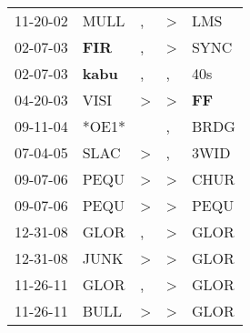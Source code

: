 \begin{supertabular}{p{0.07\textwidth}p{0.06\textwidth}p{0.02\textwidth}p{0.02\textwidth}p{0.06\textwidth}}
 11-20-02\textsuperscript{} &           MULL\textsuperscript{} &             , &  \textgreater &          LMS\textsuperscript{} \\
 02-07-03\textsuperscript{} &   \textbf{FIR\textsuperscript{}} &             , &  \textgreater &         SYNC\textsuperscript{} \\
 02-07-03\textsuperscript{} &  \textbf{kabu\textsuperscript{}} &             , &             , &          40s\textsuperscript{} \\
 04-20-03\textsuperscript{} &           VISI\textsuperscript{} &  \textgreater &  \textgreater &  \textbf{FF\textsuperscript{}} \\
 09-11-04\textsuperscript{} &                            *OE1* &               &             , &         BRDG\textsuperscript{} \\
 07-04-05\textsuperscript{} &           SLAC\textsuperscript{} &  \textgreater &             , &         3WID\textsuperscript{} \\
 09-07-06\textsuperscript{} &           PEQU\textsuperscript{} &  \textgreater &  \textgreater &         CHUR\textsuperscript{} \\
 09-07-06\textsuperscript{} &           PEQU\textsuperscript{} &  \textgreater &  \textgreater &         PEQU\textsuperscript{} \\
 12-31-08\textsuperscript{} &           GLOR\textsuperscript{} &             , &  \textgreater &         GLOR\textsuperscript{} \\
 12-31-08\textsuperscript{} &           JUNK\textsuperscript{} &  \textgreater &  \textgreater &         GLOR\textsuperscript{} \\
 11-26-11\textsuperscript{} &           GLOR\textsuperscript{} &             , &  \textgreater &         GLOR\textsuperscript{} \\
 11-26-11\textsuperscript{} &           BULL\textsuperscript{} &  \textgreater &  \textgreater &         GLOR\textsuperscript{} \\
\end{supertabular}
